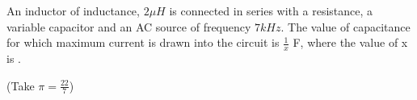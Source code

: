 
\item An inductor of inductance, $2\mu H$ is connected in series with a resistance, a variable capacitor and an AC source of frequency $7kHz$. The value of capacitance for which maximum current is drawn into the circuit is $\frac{1}{x}$ F, where the value of x is \underline{\hspace{2.5cm}}.
    
    (Take $\pi = \frac{22}{7}$)
